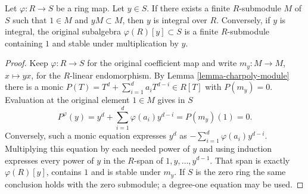 \begin{lemma}
\label{lemma-characterize-integral-element}
Let $\varphi : R \to S$ be a ring map. Let $y \in S$. If there exists a
finite $R$-submodule $M$ of $S$ such that $1 \in M$ and $yM \subset M$,
then $y$ is integral over $R$.
Conversely, if $y$ is integral, the original subalgebra
$\varphi(R)[y]\subset S$ is a finite $R$-submodule containing $1$
and stable under multiplication by $y$.
\end{lemma}

\begin{proof}
Keep $\varphi:R\to S$ for the original coefficient map and write
$m_y:M\to M$, $x\mapsto yx$, for the $R$-linear endomorphism.
By Lemma \ref{lemma-charpoly-module} there is a monic
$P(T)=T^d+\sum_{i=1}^d a_iT^{d-i}\in R[T]$ with $P(m_y)=0$.
Evaluation at the original element $1\in M$ gives in $S$
$$
P^\varphi(y)=y^d+\sum_{i=1}^d\varphi(a_i)y^{d-i}
=P(m_y)(1)=0.
$$
Conversely, such a monic equation expresses $y^d$ as
$-\sum_{i=1}^d\varphi(a_i)y^{d-i}$. Multiplying this equation by
each needed power of $y$ and using induction expresses every power
of $y$ in the $R$-span of $1,y,\ldots,y^{d-1}$.
That span is exactly $\varphi(R)[y]$, contains $1$ and is stable
under $m_y$. If $S$ is the zero ring the same conclusion holds with
the zero submodule; a degree-one equation may be used.
\end{proof}